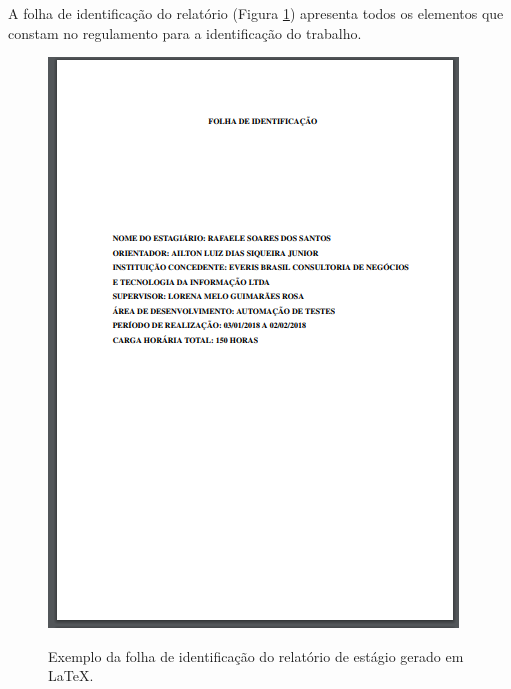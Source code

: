 \newpage
A folha de identificação do relatório (Figura \ref{folhaidentest}) apresenta todos os elementos que constam no regulamento para a identificação do trabalho.\\
\begin{figure}[h]
	\centering
	\includegraphics{imagens/relatorioEstagio/FolhaIdentif.png}\\
	\caption{Exemplo da folha de identificação do relatório de estágio gerado em LaTeX.}
	\label{folhaidentest}
\end{figure}

